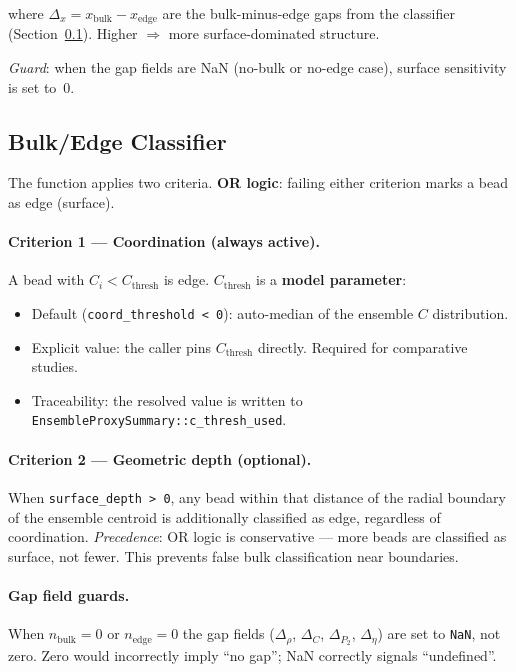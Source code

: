 \documentclass[11pt]{article}
\begin{document}
where $\Delta_x = x_\text{bulk} - x_\text{edge}$ are the bulk-minus-edge
gaps from the classifier (Section~\ref{sec:bulk_edge_classifier}).
Higher $\Rightarrow$ more surface-dominated structure.

\textit{Guard}: when the gap fields are NaN (no-bulk or no-edge case),
surface sensitivity is set to~$0$.

\subsection{Bulk/Edge Classifier}
\label{sec:bulk_edge_classifier}

The function  applies two criteria.  \textbf{OR
logic}: failing either criterion marks a bead as edge (surface).

\paragraph{Criterion 1 — Coordination (always active).}
A bead with $C_i < C_\text{thresh}$ is edge.
$C_\text{thresh}$ is a \textbf{model parameter}:
\begin{itemize}
  \item Default (\texttt{coord\_threshold < 0}): auto-median of the
        ensemble $C$ distribution.
  \item Explicit value: the caller pins $C_\text{thresh}$ directly.
        Required for comparative studies.
  \item Traceability: the resolved value is written to
        \texttt{EnsembleProxySummary::c\_thresh\_used}.
\end{itemize}

\paragraph{Criterion 2 — Geometric depth (optional).}
When \texttt{surface\_depth > 0}, any bead within that distance of the
radial boundary of the ensemble centroid is additionally classified as edge,
regardless of coordination.
\textit{Precedence}: OR logic is conservative --- more beads are classified
as surface, not fewer.  This prevents false bulk classification near
boundaries.

\paragraph{Gap field guards.}
When $n_\text{bulk} = 0$ or $n_\text{edge} = 0$ the gap fields
($\Delta_\rho$, $\Delta_C$, $\Delta_{P_2}$, $\Delta_\eta$) are set to
\texttt{NaN}, not zero.  Zero would incorrectly imply ``no gap''; NaN
correctly signals ``undefined''.
\end{document}

